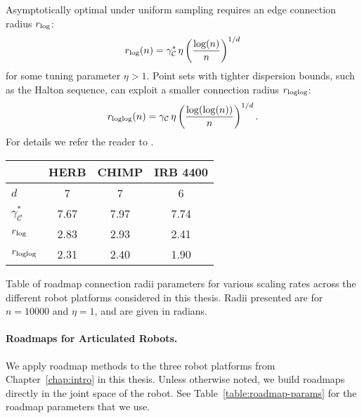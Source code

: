 Asymptotically optimal under uniform sampling requires
an edge connection radius $r_{\mbox{\scriptsize log}}$:
\begin{equation}
   r_{\mbox{\scriptsize log}}(n) =  \gamma^*_{\mathcal{C}} \, \eta
      \left( \frac{\log(n)}{n} \right)^{1/d}
\end{equation}
for some tuning parameter $\eta > 1$.
Point sets with tighter dispersion bounds,
such as the Halton sequence,
can exploit a smaller connection radius $r_{\mbox{\scriptsize loglog}}$:
\begin{equation}
   r_{\mbox{\scriptsize loglog}}(n) = \gamma_{\mathcal{C}} \, \eta
      \left( \frac{\log(\log(n))}{n} \right)^{1/d}.
\end{equation}
For details we refer the reader
to \citep{janson2015deterministicsampling}.

\begin{margintable}
   \centering
   {\renewcommand{\tabcolsep}{0.15cm}
   \begin{tabular}{lccc}
      \toprule
      & HERB & CHIMP & IRB 4400 \\
      \midrule
      $d$ & 7 & 7 & 6 \\
      $\gamma^*_{\mathcal{C}}$ & 7.67 & 7.97 & 7.74 \\
      $r_{\mbox{\scriptsize log}}$ & 2.83 & 2.93 & 2.41 \\
      $r_{\mbox{\scriptsize loglog}}$ & 2.31 & 2.40 & 1.90 \\
      \bottomrule
   \end{tabular}
   }
   \vspace{0.1cm}
   \caption{Table of roadmap connection radii parameters for
      various scaling rates across the different robot platforms
      considered in this thesis.
      Radii presented are for $n=10000$ and $\eta = 1$,
      and are given in radians.}
   \label{table:roadmap-params}
\end{margintable}

\paragraph{Roadmaps for Articulated Robots.}
We apply roadmap methods to the three robot platforms
from Chapter~\ref{chap:intro} in this thesis.
Unless otherwise noted,
we build roadmaps directly in the joint space of the robot.
See Table~\ref{table:roadmap-params} for the roadmap parameters
that we use.


